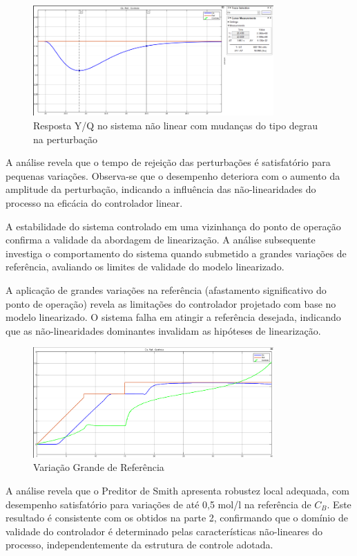 \documentclass[a4paper,12pt]{article}
\begin{document}
\begin{figure}[H]
  \centering
  \includegraphics[width=0.82\textwidth]{figure7.png}
  \caption{Resposta Y/Q no sistema não linear com mudanças do tipo degrau na perturbação}
  \end{figure}

A análise revela que o tempo de rejeição das perturbações é satisfatório para pequenas variações. Observa-se que o desempenho deteriora com o aumento da amplitude da perturbação, indicando a influência das não-linearidades do processo na eficácia do controlador linear.

A estabilidade do sistema controlado em uma vizinhança do ponto de operação confirma a validade da abordagem de linearização. A análise subsequente investiga o comportamento do sistema quando submetido a grandes variações de referência, avaliando os limites de validade do modelo linearizado.

A aplicação de grandes variações na referência (afastamento significativo do ponto de operação) revela as limitações do controlador projetado com base no modelo linearizado. O sistema falha em atingir a referência desejada, indicando que as não-linearidades dominantes invalidam as hipóteses de linearização.

\begin{figure}[H]
  \centering
  \includegraphics[width=0.82\textwidth]{figure8.png}
  \caption{Variação Grande de Referência}
  \end{figure}

A análise revela que o Preditor de Smith apresenta robustez local adequada, com desempenho satisfatório para variações de até 0,5 mol/l na referência de $C_B$. Este resultado é consistente com os obtidos na parte 2, confirmando que o domínio de validade do controlador é determinado pelas características não-lineares do processo, independentemente da estrutura de controle adotada.
\end{document}
